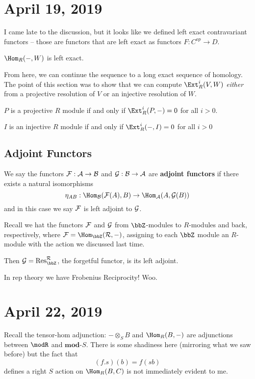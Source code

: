 \documentclass[12pt]{article}
\begin{document}
\section{April 19, 2019}
I came late to the discussion, but it looks like we defined left exact contravariant functors --
those are functors that are left exact as functors $F:C^{op}\to D$.

\begin{rmk}
	$\Hom_R(-,W)$ is left exact.
\end{rmk}

From here, we can continue the sequence to a long exact sequence of homology. The point of this 
section was to show that we can compute $\Ext_R^i(V,W)$ \textit{either} from a projective resolution of $V$ or 
an injective resolution of $W$.

\begin{lem}
	$P$ is a projective $R$ module if and only if $\Ext_R^i(P,-)=0$ for all $i>0$.
\end{lem}
\begin{lem}
	$I$ is an injective $R$ module if and only if $\Ext_R^i(-,I)=0$ for all $i>0$
\end{lem}
\subsection{Adjoint Functors}
\begin{defn}
	We say the functors $\cal F:\cal A\to \cal B$ and $\cal G:\cal B\to \cal A$ are \textbf{adjoint functors}
	if there exists a natural isomorphisms
	\[\eta_{AB}:\Hom_{\cal B}({\cal F}(A),B)\to \Hom_{\cal A}(A,{\cal G}(B))\]
	and in this case we say $\cal F$ is left adjoint to $\cal G$.
\end{defn}
\begin{ex}
	Recall we hat the functors $\cal F$ and $\cal G$ from $\bbZ$-modules to $R$-modules and back, respectively,
	where $\cal F=\Hom_\bbZ(R,-)$, assigning to each $\bbZ$ module an $R$-module with the action we discussed last time.

	Then $\cal G=\operatorname{Res}_\bbZ^R$, the forgetful functor, is its left adjoint.
\end{ex}
\begin{ex}
	In rep theory we have Frobenius Reciprocity! Woo.
\end{ex}

\section{April 22, 2019}
Recall the tensor-hom adjunction: $-\otimes_S B$ and $\Hom_R(B,-)$ are adjunctions between $\modR$ and $\mathbf{mod}$-$S$.
There is some shadiness here (mirroring what we saw before) but the fact that 
\[(f.s)(b)=f(sb)\]
defines a right $S$ action on $\Hom_R(B,C)$ is not immediately evident to me.
\end{document}
